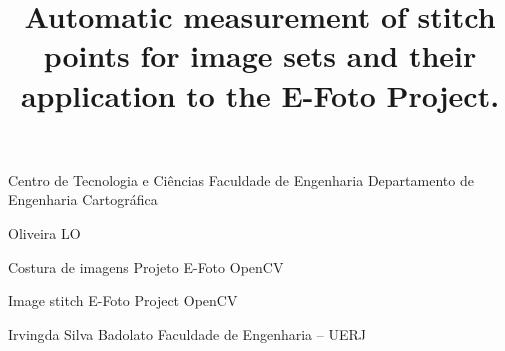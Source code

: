 


            {Centro de Tecnologia e Ciências} 
            {Faculdade de Engenharia} 
            {Departamento de Engenharia Cartográfica} 
             

      {Oliveira}
      {LO}

               {Costura de imagens}
               {Projeto E-Foto}
               {OpenCV}

\title{Automatic measurement of stitch points for image sets and their application to the E-Foto Project.}
         {Image stitch}
         {E-Foto Project}
         {OpenCV}

           {Irving}{da Silva Badolato} 
           {Faculdade de Engenharia -- UERJ} 






